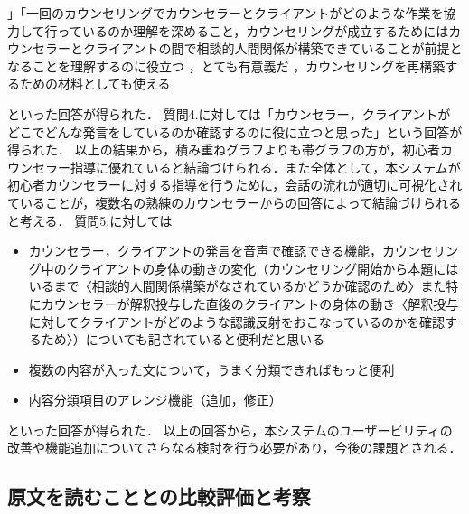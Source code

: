 \documentclass[shuuron]{kuee}
\begin{document}
\begin{itemize}

  」「一回のカウンセリングでカウンセラーとクライアントがどのような作業を協力して行っているのか理解を深めること，カウンセリングが成立するためにはカウンセラーとクライアントの間で相談的人間関係が構築できていることが前提となることを理解するのに役立つ
，とても有意義だ
，カウンセリングを再構築するための材料としても使える
\end{itemize}

といった回答が得られた．
質問4.に対しては「カウンセラー，クライアントがどこでどんな発言をしているのか確認するのに役に立つと思った」という回答が得られた．
以上の結果から，積み重ねグラフよりも帯グラフの方が，初心者カウンセラー指導に優れていると結論づけられる．また全体として，本システムが初心者カウンセラーに対する指導を行うために，会話の流れが適切に可視化されていることが，複数名の熟練のカウンセラーからの回答によって結論づけられると考える．
質問5.に対しては

\begin{itemize}

  \item カウンセラー，クライアントの発言を音声で確認できる機能，カウンセリング中のクライアントの身体の動きの変化（カウンセリング開始から本題にはいるまで〈相談的人間関係構築がなされているかどうか確認のため〉また特にカウンセラーが解釈投与した直後のクライアントの身体の動き〈解釈投与に対してクライアントがどのような認識反射をおこなっているのかを確認するため〉）についても記されていると便利だと思いる
\item 複数の内容が入った文について，うまく分類できればもっと便利
\item 内容分類項目のアレンジ機能（追加，修正）
\end{itemize}



といった回答が得られた．
以上の回答から，本システムのユーザービリティの改善や機能追加についてさらなる検討を行う必要があり，今後の課題とされる．

\subsection{原文を読むこととの比較評価と考察}%

\end{document}
